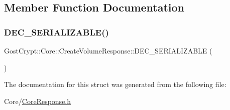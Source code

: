 \subsection{Member Function Documentation}
\mbox{\label{struct_gost_crypt_1_1_core_1_1_create_volume_response_ab46fe65b01316d69f5e0322224891851}} 
\subsubsection{\texorpdfstring{D\+E\+C\+\_\+\+S\+E\+R\+I\+A\+L\+I\+Z\+A\+B\+L\+E()}{DEC\_SERIALIZABLE()}}
{\footnotesize\ttfamily Gost\+Crypt\+::\+Core\+::\+Create\+Volume\+Response\+::\+D\+E\+C\+\_\+\+S\+E\+R\+I\+A\+L\+I\+Z\+A\+B\+LE (\begin{DoxyParamCaption}\item[{\hyperlink{struct_gost_crypt_1_1_core_1_1_create_volume_response}{Create\+Volume\+Response}}]{ }\end{DoxyParamCaption})}



The documentation for this struct was generated from the following file\+:\begin{DoxyCompactItemize}
\item 
Core/\hyperlink{_core_response_8h}{Core\+Response.\+h}\end{DoxyCompactItemize}

